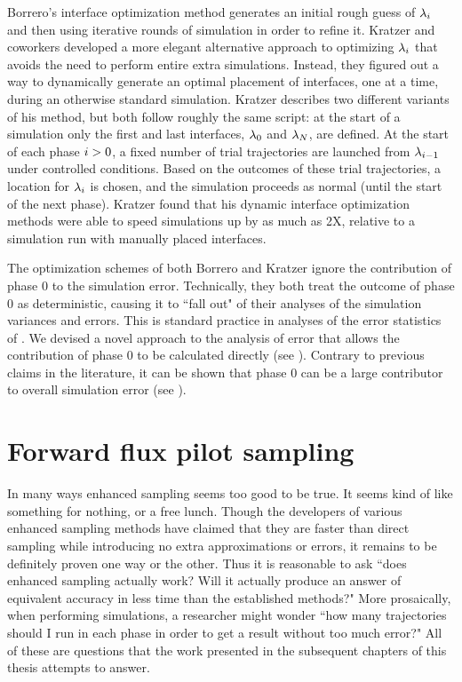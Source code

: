Borrero's interface optimization method generates an initial rough guess of ${\lambda}_{i}$ and then using iterative rounds of  simulation in order to refine it. Kratzer and coworkers developed a more elegant alternative approach\cite{Kratzer:2013fs} to optimizing ${\lambda}_{i}$ that avoids the need to perform entire extra simulations. Instead, they figured out a way to dynamically generate an optimal placement of interfaces, one at a time, during an otherwise standard  simulation. Kratzer describes two different variants of his method, but both follow roughly the same script: at the start of a simulation only the first and last interfaces, ${\lambda}_{0}$ and ${\lambda}_{N}$, are defined. At the start of each phase $i>0$, a fixed number of trial trajectories are launched from ${\lambda}_{i - 1}$ under controlled conditions. Based on the outcomes of these trial trajectories, a location for ${\lambda}_{i}$ is chosen, and the  simulation proceeds as normal (until the start of the next phase). Kratzer found that his dynamic interface optimization methods were able to speed simulations up by as much as 2X, relative to a simulation run with manually placed interfaces.

The optimization schemes of both Borrero and Kratzer ignore the contribution of phase $0$ to the simulation error. Technically, they both treat the outcome of phase $0$ as deterministic, causing it to ``fall out" of their analyses of the simulation variances and errors. This is standard practice\cite{Allen:2006ch} in analyses of the error statistics of . We devised a novel approach to the analysis of  error that allows the contribution of phase $0$ to be calculated directly (see ). Contrary to previous claims\cite{Allen:2009kb} in the literature, it can be shown that phase $0$ can be a large contributor to overall simulation error (see ).

\section{Forward flux pilot sampling}\label{sec:intro_ffpilot}
In many ways enhanced sampling seems too good to be true. It seems kind of like something for nothing, or a free lunch. Though the developers of various enhanced sampling methods have claimed that they are faster than direct sampling while introducing no extra approximations or errors\cite{Zhang:2010kfa,Allen:2006ch}, it remains to be definitely proven one way or the other. Thus it is reasonable to ask ``does enhanced sampling actually work? Will it actually produce an answer of equivalent accuracy in less time than the established methods?" More prosaically, when performing  simulations, a researcher might wonder ``how many trajectories should I run in each phase in order to get a result without too much error?" All of these are questions that the work presented in the subsequent chapters of this thesis attempts to answer.

